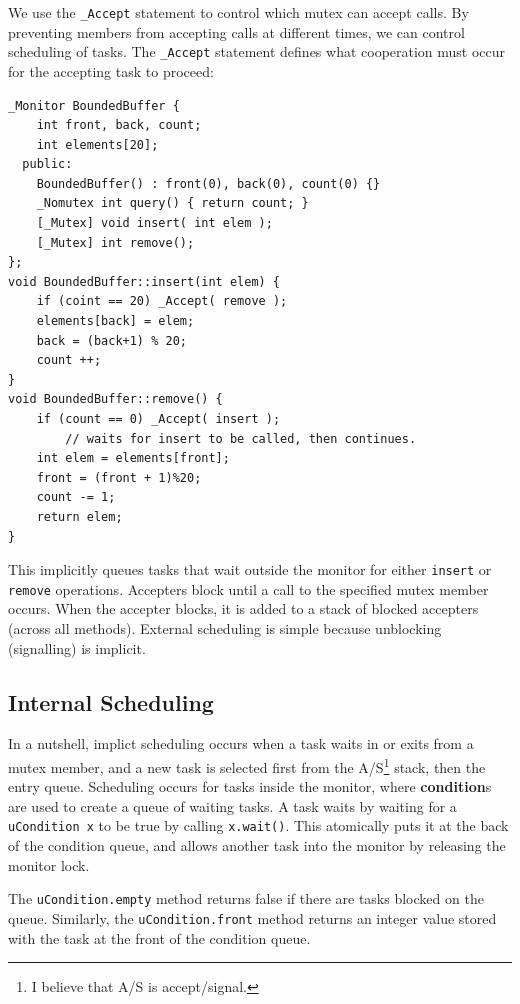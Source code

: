                 We use the \uC \verb|_Accept| statement to control which mutex can accept calls.
                By preventing members from accepting calls at different times, we can control scheduling of tasks.
                The \verb|_Accept| statement defines what cooperation must occur for the accepting task to proceed:
                \begin{lstlisting}
_Monitor BoundedBuffer {
    int front, back, count;
    int elements[20];
  public:
    BoundedBuffer() : front(0), back(0), count(0) {}
    _Nomutex int query() { return count; }
    [_Mutex] void insert( int elem );
    [_Mutex] int remove();
};
void BoundedBuffer::insert(int elem) {
    if (coint == 20) _Accept( remove );
    elements[back] = elem;
    back = (back+1) % 20;
    count ++;
}
void BoundedBuffer::remove() {
    if (count == 0) _Accept( insert );
        // waits for insert to be called, then continues.
    int elem = elements[front];
    front = (front + 1)%20;
    count -= 1;
    return elem;
}
                \end{lstlisting}
                This implicitly queues tasks that wait outside the monitor for either \verb|insert| or \verb|remove| operations.
                Accepters block until a call to the specified mutex member occurs.
                When the accepter blocks, it is added to a stack of blocked accepters (across all methods).
                External scheduling is simple because unblocking (signalling) is implicit.
            \subsection{Internal Scheduling} %
            \label{sub:internal_scheduling}
                In a nutshell, implict scheduling occurs when a task waits in or exits from a mutex member, and a new task is selected first from the A/S\footnote{I believe that A/S is accept/signal.} stack, then the entry queue.
                Scheduling occurs for tasks inside the monitor, where \textbf{condition}s are used to create a queue of waiting tasks.
                A task waits by waiting for a \verb|uCondition x| to be true by calling \verb|x.wait()|.
                This atomically puts it at the back of the condition queue, and allows another task into the monitor by releasing the monitor lock.

                The \verb|uCondition.empty| method returns false if there are tasks blocked on the queue.
                Similarly, the \verb|uCondition.front| method returns an integer value stored with the task at the front of the condition queue.

